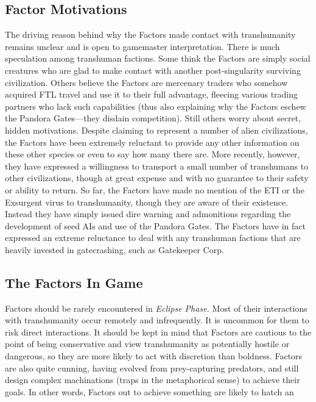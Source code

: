 \subsection{Factor Motivations} 

The driving reason behind why the Factors made contact with transhumanity remains unclear and is open to gamemaster interpretation. There is much speculation among transhuman factions. Some think the Factors are simply social creatures who are glad to make contact with another post-singularity surviving civilization. Others believe the Factors are mercenary traders who somehow acquired FTL travel and use it to their full advantage, fleecing various trading partners who lack such capabilities (thus also explaining why the Factors eschew the Pandora Gates—they disdain competition). Still others worry about secret, hidden motivations. Despite claiming to represent a number of alien civilizations, the Factors have been extremely reluctant to provide any other information on these other species or even to say how many there are. More recently, however, they have expressed a willingness to transport a small number of transhumans to other civilizations, though at great expense and with no guarantee to their safety or ability to return. So far, the Factors have made no mention of the ETI or the Exsurgent virus to transhumanity, though they are aware of their existence. Instead they have simply issued dire warning and admonitions regarding the development of seed AIs and use of the Pandora Gates. The Factors have in fact expressed an extreme reluctance to deal with any transhuman factions that are heavily invested in gatecrashing, such as Gatekeeper Corp. 

\subsection{The Factors In Game } 

Factors should be rarely encountered in \textit{Eclipse Phase.} Most of their interactions with transhumanity occur remotely and infrequently. It is uncommon for them to risk direct interactions. It should be kept in mind that Factors are cautious to the point of being conservative and view transhumanity as potentially hostile or dangerous, so they are more likely to act with discretion than boldness. Factors are also quite cunning, having evolved from prey-capturing predators, and still design complex machinations (traps in the metaphorical sense) to achieve their goals. In other words, Factors out to achieve something are likely to hatch an 

